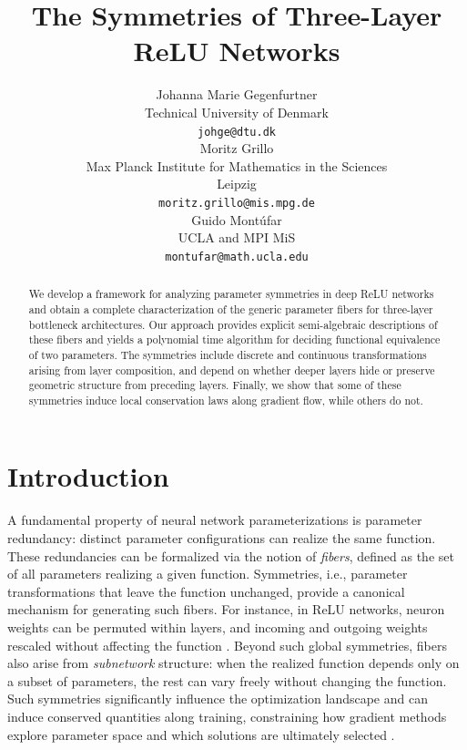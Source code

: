 \documentclass{article}
\title{The Symmetries of Three-Layer ReLU Networks}
\author{%
   Johanna Marie Gegenfurtner \\
   Technical University of Denmark \\
   \texttt{johge@dtu.dk} \\
    \And
   Moritz Grillo \\
  Max Planck Institute for Mathematics in the Sciences\\
    Leipzig\\
  \texttt{moritz.grillo@mis.mpg.de} \\
  \And
   Guido Mont\'ufar \\ 
   UCLA and MPI MiS\\
   \texttt{montufar@math.ucla.edu}
}
\theoremstyle{definition}
\begin{document}
\maketitle


\begin{abstract}
We develop a framework for analyzing parameter symmetries in deep ReLU networks and obtain a complete characterization of the generic parameter fibers for three-layer bottleneck architectures. Our approach provides explicit semi-algebraic descriptions of these fibers and yields a polynomial time algorithm for deciding functional equivalence of two parameters. The symmetries include discrete and continuous transformations arising from layer composition, and depend on whether deeper layers hide or preserve geometric structure from preceding layers. Finally, we show that some of these symmetries induce local conservation laws along gradient flow, while others do not. 
\end{abstract}


\section{Introduction}

A fundamental property of neural network parameterizations is parameter redundancy: distinct parameter configurations can realize the same function. 
%
These redundancies can be formalized via the notion of \emph{fibers}, defined as the set of all parameters realizing a given function. 
%
Symmetries, i.e., parameter transformations that leave the function unchanged, provide a canonical mechanism for generating such fibers. 
For instance, in ReLU networks, neuron weights can be permuted within layers, and incoming and outgoing weights rescaled without affecting the function 
\citep{Kurkova1994, rolnick2020reverse}. 
%
Beyond such global symmetries, fibers also arise from \emph{subnetwork} structure: when the realized function depends only on a subset of parameters, the rest can vary freely without changing the function. 
%
Such symmetries significantly influence the optimization landscape and can induce conserved quantities along training, constraining how gradient methods explore parameter space and which solutions are ultimately selected \citep{głuch2021noetherthingschangestay,
kunin2021neural,
zhao2023symmetries,
zhao2025symmetryneuralnetworkparameter,
nurisso2026topology}. 
\end{document}
